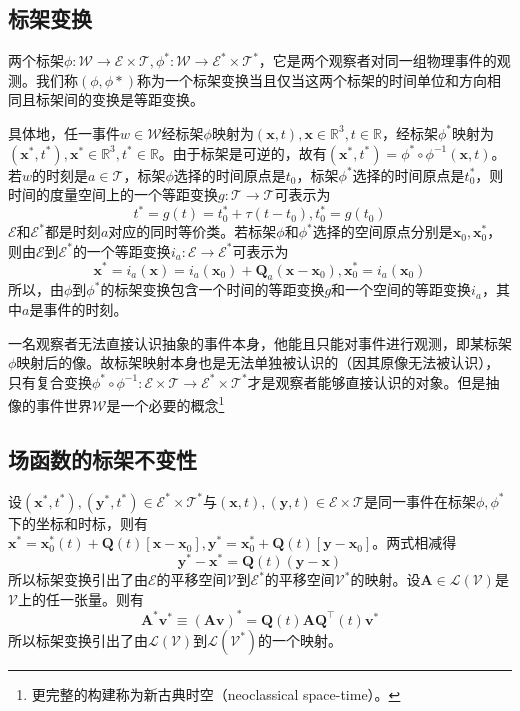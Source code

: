 \documentclass[main.tex]{subfiles}
\begin{document}
\subsection{标架变换}
两个标架$\phi:\mathcal{W}\rightarrow\mathcal{E}\times\mathcal{T},\phi^*:\mathcal{W}\rightarrow\mathcal{E}^*\times\mathcal{T}^*$，它是两个观察者对同一组物理事件的观测。我们称$\left(\phi,\phi*\right)$称为一个标架变换当且仅当这两个标架的时间单位和方向相同且标架间的变换是等距变换。

具体地，任一事件$w\in\mathcal{W}$经标架$\phi$映射为$\left(\mathbf{x},t\right),\mathbf{x}\in\mathbb{R}^3,t\in\mathbb{R}$，经标架$\phi^*$映射为$\left(\mathbf{x}^*,t^*\right),\mathbf{x}^*\in\mathbb{R}^3,t^*\in\mathbb{R}$。由于标架是可逆的，故有$\left(\mathbf{x}^*,t^*\right)=\phi^*\circ\phi^{-1}\left(\mathbf{x},t\right)$。若$w$的时刻是$a\in\mathcal{T}$，标架$\phi$选择的时间原点是$t_0$，标架$\phi^*$选择的时间原点是$t_0^*$，则时间的度量空间上的一个等距变换$g:\mathcal{T}\rightarrow\mathcal{T}$可表示为
\[t^*=g\left(t\right)=t_0^*+\tau\left(t-t_0\right),t_0^*=g\left(t_0\right)\]
$\mathcal{E}$和$\mathcal{E}^*$都是时刻$a$对应的同时等价类。若标架$\phi$和$\phi^*$选择的空间原点分别是$\mathbf{x}_0,\mathbf{x}_0^*$，则由$\mathcal{E}$到$\mathcal{E}^*$的一个等距变换$i_a:\mathcal{E}\rightarrow\mathcal{E}^*$可表示为
\[\mathbf{x}^*=i_a\left(\mathbf{x}\right)=i_a\left(\mathbf{x}_0\right)+\mathbf{Q}_a\left(\mathbf{x}-\mathbf{x}_0\right),\mathbf{x}_0^*=i_a\left(\mathbf{x}_0\right)\]
所以，由$\phi$到$\phi^*$的标架变换包含一个时间的等距变换$g$和一个空间的等距变换$i_a$，其中$a$是事件的时刻。

一名观察者无法直接认识抽象的事件本身，他能且只能对事件进行观测，即某标架$\phi$映射后的像。故标架映射本身也是无法单独被认识的（因其原像无法被认识），只有复合变换$\phi^*\circ\phi^{-1}:\mathcal{E}\times\mathcal{T}\rightarrow\mathcal{E}^*\times\mathcal{T}^*$才是观察者能够直接认识的对象。但是抽像的事件世界$\mathcal{W}$是一个必要的概念\footnote{更完整的构建称为新古典时空（neoclassical space-time）\cite{Noll1974,Noll2011}。}

\subsection{场函数的标架不变性}
设$\left(\mathbf{x}^*,t^*\right),\left(\mathbf{y}^*,t^*\right)\in\mathcal{E}^*\times\mathcal{T}^*$与$\left(\mathbf{x},t\right),\left(\mathbf{y},t\right)\in\mathcal{E}\times\mathcal{T}$是同一事件在标架$\phi,\phi^*$下的坐标和时标，则有$\mathbf{x}^*=\mathbf{x}_0^*\left(t\right)+\mathbf{Q}\left(t\right)\left[\mathbf{x}-\mathbf{x}_0\right],\mathbf{y}^*=\mathbf{x}_0^*+\mathbf{Q}\left(t\right)\left[\mathbf{y}-\mathbf{x}_0\right]$。两式相减得
\[\mathbf{y}^*-\mathbf{x}^*=\mathbf{Q}\left(t\right)\left(\mathbf{y}-\mathbf{x}\right)\]
所以标架变换引出了由$\mathcal{E}$的平移空间$\mathcal{V}$到$\mathcal{E}^*$的平移空间$\mathcal{V}^*$的映射。设$\mathbf{A}\in\mathcal{L}\left(\mathcal{V}\right)$是$\mathcal{V}$上的任一张量。则有
\[\mathbf{A}^*\mathbf{v}^*\equiv\left(\mathbf{Av}\right)^*=\mathbf{Q}\left(t\right)\mathbf{AQ}^\intercal\left(t\right)\mathbf{v}^*
\]
所以标架变换引出了由$\mathcal{L}\left(\mathcal{V}\right)$到$\mathcal{L}\left(\mathcal{V}^*\right)$的一个映射。
\end{document}
